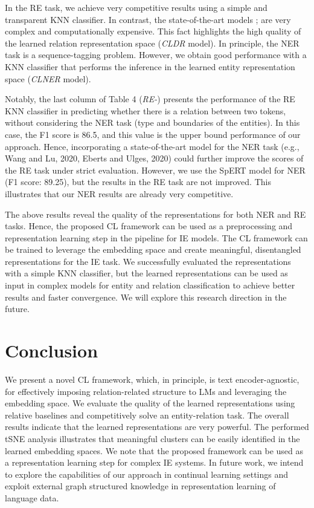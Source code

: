 \documentclass[11pt]{article}
\begin{document}
\par
In the RE task, we achieve very competitive results using a simple and transparent KNN classifier. In contrast, the state-of-the-art models \cite{wang2020two}; \cite{zhaomodeling} are very complex and computationally expensive. This fact highlights the high quality of the learned relation representation space (\textit{CLDR} model). In principle, the NER task is a sequence-tagging problem. However, we obtain good performance with a KNN classifier that performs the inference in the learned entity representation space (\textit{CLNER} model).

\par
Notably, the last column of Table 4 (\textit{RE-}) presents the performance of the RE KNN classifier in predicting whether there is a relation between two tokens, without considering the NER task (type and boundaries of the entities). In this case, the F1 score is 86.5, and this value is the upper bound performance of our approach. Hence, incorporating a state-of-the-art model for the NER task (e.g., Wang and Lu, 2020, Eberts and Ulges, 2020) could further improve the scores of the RE task under strict evaluation. However, we use the SpERT model \cite{ebertsspan} for NER (F1 score: 89.25), but the results in the RE task are not improved. This illustrates that our NER results are already very competitive.

\par 
The above results reveal the quality of the representations for both NER and RE tasks. Hence, the proposed CL framework can be used as a preprocessing and representation learning step in the pipeline for IE models. The CL framework can be trained to leverage the embedding space and create meaningful, disentangled representations for the IE task. We successfully evaluated the representations with a simple KNN classifier, but the learned representations can be used as input in complex models for entity and relation classification to achieve better results and faster convergence. We will explore this research direction in the future.

\vspace{-1mm}
\section{Conclusion}
\vspace{-0.5mm}
We present a novel CL framework, which, in principle, is text encoder-agnostic, for effectively imposing relation-related structure to LMs and leveraging the embedding space. We evaluate the quality of the learned representations using relative baselines and competitively solve an entity-relation task. The overall results indicate that the learned representations are very powerful. The performed tSNE analysis illustrates that meaningful clusters can be easily identified in the learned embedding spaces. We note that the proposed framework can be used as a representation learning step for complex IE systems. In future work, we intend to explore the capabilities of our approach in continual learning settings and exploit external graph structured knowledge in representation learning of language data.





\end{document}
